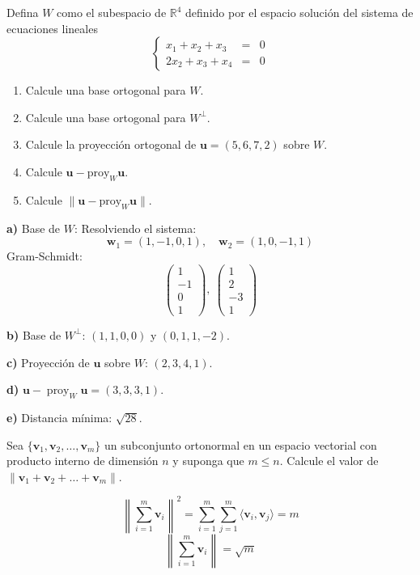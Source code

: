 \begin{prob}
Defina $W$ como el subespacio de $\mathbb{R}^4$ definido por el espacio solución del sistema de ecuaciones lineales
\[
\left\lbrace
\begin{array}{ccc}
x_1+x_2+x_3&=&0\\
2x_2+x_3+x_4&=&0
\end{array}
\right.
\]
\begin{enumerate}
\item Calcule una base ortogonal para $W$.
\item Calcule una base ortogonal para $W^{\perp}$.
\item Calcule la proyección ortogonal de $\mathbf{u}=(5,6,7,2)$ sobre $W$.
\item Calcule $\mathbf{u}-\text{proy}_{W}\mathbf{u}$.
\item Calcule $\lVert \mathbf{u}-\text{proy}_{W}\mathbf{u}\rVert$.
\end{enumerate}
\begin{myproof}
\textbf{a)} Base de \( W \): Resolviendo el sistema:
\[
\mathbf{w}_1 = (1, -1, 0, 1),\quad \mathbf{w}_2 = (1, 0, -1, 1)
\]
Gram-Schmidt:
\[
\boxed{\begin{pmatrix} 1 \\ -1 \\ 0 \\ 1 \end{pmatrix},\ \begin{pmatrix} 1 \\ 2 \\ -3 \\ 1 \end{pmatrix}}
\]

\textbf{b)} Base de \( W^\perp \): \( (1,1,0,0) \) y \( (0,1,1,-2) \).

\textbf{c)} Proyección de \( \mathbf{u} \) sobre \( W \): \( (2,3,4,1) \).

\textbf{d)} \( \mathbf{u} - \operatorname{proy}_W \mathbf{u} = (3,3,3,1) \).

\textbf{e)} Distancia mínima: \( \sqrt{28} \).
\end{myproof}
\end{prob}

\begin{prob}
Sea $\{\mathbf{v}_1, \mathbf{v}_2, \dots, \mathbf{v}_m\}$ un subconjunto ortonormal en un espacio vectorial con producto interno de dimensión $n$ y suponga que $m\leq n$. Calcule el valor de $\lVert  \mathbf{v}_1+ \mathbf{v}_2+\dots +  \mathbf{v}_m \rVert$.
\begin{myproof}
\[
\left\| \sum_{i=1}^m \mathbf{v}_i \right\|^2 = \sum_{i=1}^m \sum_{j=1}^m \langle \mathbf{v}_i, \mathbf{v}_j \rangle = m
\]
\[
\boxed{\left\| \sum_{i=1}^m \mathbf{v}_i \right\| = \sqrt{m}}
\]
\end{myproof}
\end{prob}

